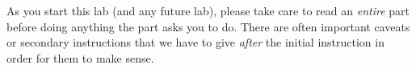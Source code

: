 \documentclass[lab]{inc/122handout}
\begin{document}
\thispagestyle{empty}
As you start this lab (and any future lab), please take care to
read an \emph{entire} part before doing anything the part asks you to
do. There are often important caveats or secondary instructions that
we have to give \emph{after} the initial instruction in order for them
to make sense.

\end{document}

